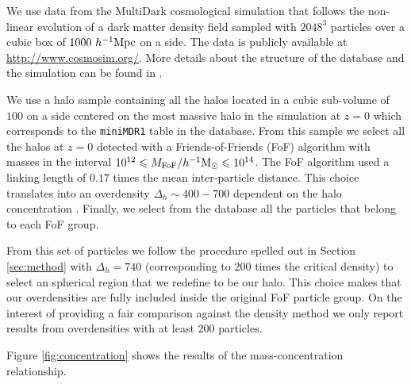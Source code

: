 \documentclass[a4,useAMS,usenatbib,usegraphicx]{mn2e}
\newcommand{\hMpc}{{\ifmmode{h^{-1}{\rm Mpc}}\else{$h^{-1}$Mpc}\fi}}
\newcommand{\hMsun}{{\ifmmode{h^{-1}{\rm {M_{\odot}}}}\else{$h^{-1}{\rm{M_{\odot}}}$}\fi}}
\begin{document}
We use data from the MultiDark cosmological simulation that follows
the non-linear evolution of a dark matter density field sampled with
$2048^3$ particles over a cubic box of $1000\ \hMpc$ on a side.  
The data is publicly available at \url{http://www.cosmosim.org/}.
More details about the structure of the database and the simulation
can be found in \citep{2013AN....334..691R}.


We use a halo sample containing all the halos located in a cubic
sub-volume of $100$ \hMpc on a side centered on the most massive halo
in the simulation at $z=0$  which corresponds to the \texttt{miniMDR1}
table in the  database.  
From this sample we select all the halos at $z=0$ detected
with a Friends-of-Friends (FoF) algorithm with masses in the interval
$10^{12}\leq M_{\rm FoF}/\hMsun \leq 10^{14}$.  
The FoF algorithm used a linking length of $0.17$ times the mean
inter-particle distance. This choice translates into an overdensity
$\Delta_h\sim  400-700$ dependent on the halo concentration \citep{More2011}.
Finally, we select from the database all the particles that belong to
each FoF group.

From this set of particles we follow the procedure spelled out in
Section \ref{sec:method} with $\Delta_h=740$ (corresponding to $200$
times the critical density) to select an spherical region that we
redefine to be our halo.  
This choice makes that our overdensities are fully included inside the
original FoF particle group.   
On the interest of providing a fair comparison against the density method we
only report results from overdensities with at least $200$ particles. 

Figure \ref{fig:concentration} shows the results of the
mass-concentration relationship.

\end{document}
